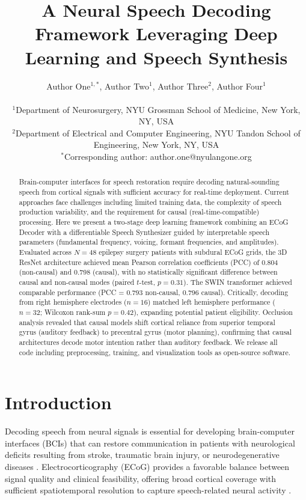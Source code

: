\documentclass[11pt]{article}
\title{A Neural Speech Decoding Framework Leveraging Deep Learning and Speech Synthesis}
\author{
Author One$^{1,*}$, Author Two$^{1}$, Author Three$^{2}$, Author Four$^{1}$ \\
\\
$^{1}$Department of Neurosurgery, NYU Grossman School of Medicine, New York, NY, USA \\
$^{2}$Department of Electrical and Computer Engineering, NYU Tandon School of Engineering, New York, NY, USA \\
$^{*}$Corresponding author: author.one@nyulangone.org
}
\date{}
\begin{document}
\maketitle

\begin{abstract}
Brain-computer interfaces for speech restoration require decoding natural-sounding speech from cortical signals with sufficient accuracy for real-time deployment. Current approaches face challenges including limited training data, the complexity of speech production variability, and the requirement for causal (real-time-compatible) processing. Here we present a two-stage deep learning framework combining an ECoG Decoder with a differentiable Speech Synthesizer guided by interpretable speech parameters (fundamental frequency, voicing, formant frequencies, and amplitudes). Evaluated across $N = 48$ epilepsy surgery patients with subdural ECoG grids, the 3D ResNet architecture achieved mean Pearson correlation coefficients (PCC) of 0.804 (non-causal) and 0.798 (causal), with no statistically significant difference between causal and non-causal modes (paired $t$-test, $p = 0.31$). The SWIN transformer achieved comparable performance (PCC = 0.793 non-causal, 0.796 causal). Critically, decoding from right hemisphere electrodes ($n = 16$) matched left hemisphere performance ($n = 32$; Wilcoxon rank-sum $p = 0.42$), expanding potential patient eligibility. Occlusion analysis revealed that causal models shift cortical reliance from superior temporal gyrus (auditory feedback) to precentral gyrus (motor planning), confirming that causal architectures decode motor intention rather than auditory feedback. We release all code including preprocessing, training, and visualization tools as open-source software.
\end{abstract}

\section{Introduction}

Decoding speech from neural signals is essential for developing brain-computer interfaces (BCIs) that can restore communication in patients with neurological deficits resulting from stroke, traumatic brain injury, or neurodegenerative diseases \citep{moses2021, willett2023, metzger2023}. Electrocorticography (ECoG) provides a favorable balance between signal quality and clinical feasibility, offering broad cortical coverage with sufficient spatiotemporal resolution to capture speech-related neural activity \citep{crone2001, bouchard2013}.
\end{document}
